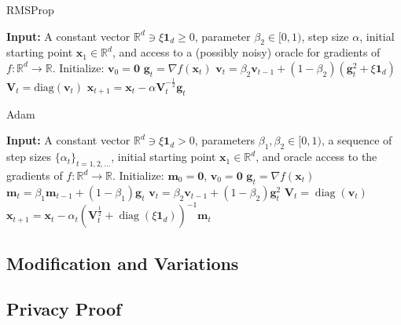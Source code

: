 \begin{algorithm}
    \caption{RMSProp}
    \label{alg:rmsprop}
    \begin{algorithmic}[1]
        \State \textbf{Input:} A constant vector $\mathbb{R}^d \ni \xi \mathbf{1}_d \geq 0$, parameter $\beta_2 \in [0, 1)$, step size $\alpha$, initial starting point $\mathbf{x}_1 \in \mathbb{R}^d$, and access to a (possibly noisy) oracle for gradients of $f : \mathbb{R}^d \rightarrow \mathbb{R}$.
            \State Initialize: $\mathbf{v}_0 = \mathbf{0}$
                \State $\mathbf{g}_t = \nabla f(\mathbf{x}_t)$
                \State $\mathbf{v}_t = \beta_2 \mathbf{v}_{t-1} + (1 - \beta_2)(\mathbf{g}_t^2 + \xi \mathbf{1}_d)$
                \State $\mathbf{V}_t = \text{diag}(\mathbf{v}_t)$
                \State $\mathbf{x}_{t+1} = \mathbf{x}_t - \alpha \mathbf{V}_t^{-\frac{1}{2}} \mathbf{g}_t$
            \EndFor
        \EndFunction
    \end{algorithmic}
\end{algorithm}
\vspace{-1cm}

\begin{algorithm}
    \caption{Adam}
    \label{alg:adam}
    \begin{algorithmic}[1]
        \State \textbf{Input:} A constant vector $\mathbb{R}^d \ni \xi \mathbf{1}_d > 0$, parameters $\beta_1, \beta_2 \in [0, 1)$, a sequence of step sizes $\{\alpha_t\}_{t=1,2,\dots}$, initial starting point $\mathbf{x}_1 \in \mathbb{R}^d$, and oracle access to the gradients of $f : \mathbb{R}^d \to \mathbb{R}$.
            \State Initialize: $\mathbf{m}_0 = \mathbf{0}$, $\mathbf{v}_0 = \mathbf{0}$
                \State $\mathbf{g}_t = \nabla f(\mathbf{x}_t)$
                \State $\mathbf{m}_t = \beta_1 \mathbf{m}_{t-1} + (1 - \beta_1) \mathbf{g}_t$
                \State $\mathbf{v}_t = \beta_2 \mathbf{v}_{t-1} + (1 - \beta_2) \mathbf{g}_t^2$
                \State $\mathbf{V}_t = \operatorname{diag}(\mathbf{v}_t)$
                \State $\mathbf{x}_{t+1} = \mathbf{x}_t - \alpha_t \left( \mathbf{V}_t^{\frac{1}{2}} + \operatorname{diag}(\xi \mathbf{1}_d) \right)^{-1} \mathbf{m}_t$
            \EndFor
        \EndFunction
    \end{algorithmic}
\end{algorithm}


\subsection{Modification and Variations}\label{subsec:modification-and-variations}


\subsection{Privacy Proof}\label{subsec:incremental-improvements}

